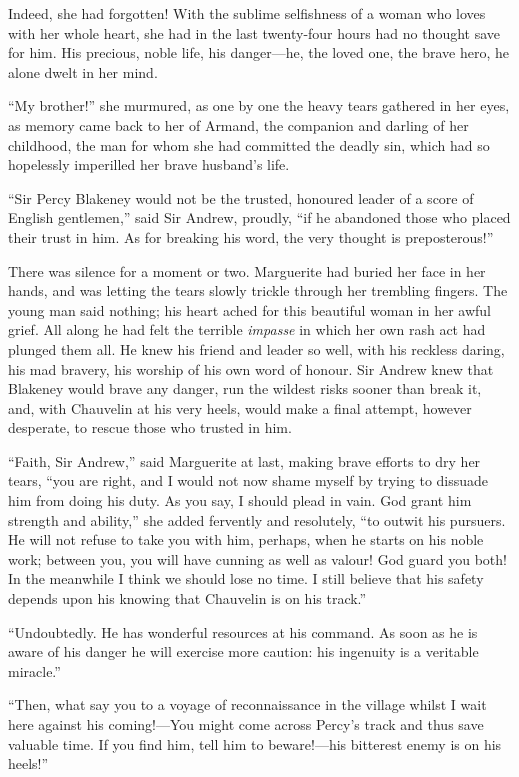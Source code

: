 \documentclass[paper=5.5in:8.5in,BCOR=7mm,twoside,DIV=calc,12pt,usegeometry,chapterprefix,endperiod,headings=big]{scrbook}
\begin{document}
Indeed, she had forgotten! With the sublime selfishness of a woman who loves with her whole heart, she had in the last twenty-four hours had no thought save for him. His precious, noble life, his danger---he, the loved one, the brave hero, he alone dwelt in her mind.

\enquote{My brother!} she murmured, as one by one the heavy tears gathered in her eyes, as memory came back to her of Armand, the companion and darling of her childhood, the man for whom she had committed the deadly sin, which had so hopelessly imperilled her brave husband's life.

\enquote{Sir Percy Blakeney would not be the trusted, honoured leader of a score of English gentlemen,} said Sir Andrew, proudly, \enquote{if he abandoned those who placed their trust in him. As for breaking his word, the very thought is preposterous!}

There was silence for a moment or two. Marguerite had buried her face in her hands, and was letting the tears slowly trickle through her trembling fingers. The young man said nothing; his heart ached for this beautiful woman in her awful grief. All along he had felt the terrible \textit{impasse} in which her own rash act had plunged them all. He knew his friend and leader so well, with his reckless daring, his mad bravery, his worship of his own word of honour. Sir Andrew knew that Blakeney would brave any danger, run the wildest risks sooner than break it, and, with Chauvelin at his very heels, would make a final attempt, however desperate, to rescue those who trusted in him.

\enquote{Faith, Sir Andrew,} said Marguerite at last, making brave efforts to dry her tears, \enquote{you are right, and I would not now shame myself by trying to dissuade him from doing his duty. As you say, I should plead in vain. God grant him strength and ability,} she added fervently and resolutely, \enquote{to outwit his pursuers. He will not refuse to take you with him, perhaps, when he starts on his noble work; between you, you will have cunning as well as valour! God guard you both! In the meanwhile I think we should lose no time. I still believe that his safety depends upon his knowing that Chauvelin is on his track.}

\enquote{Undoubtedly. He has wonderful resources at his command. As soon as he is aware of his danger he will exercise more caution: his ingenuity is a veritable miracle.}

\enquote{Then, what say you to a voyage of reconnaissance in the village whilst I wait here against his coming!---You might come across Percy's track and thus save valuable time. If you find him, tell him to beware!---his bitterest enemy is on his heels!}
\end{document}
